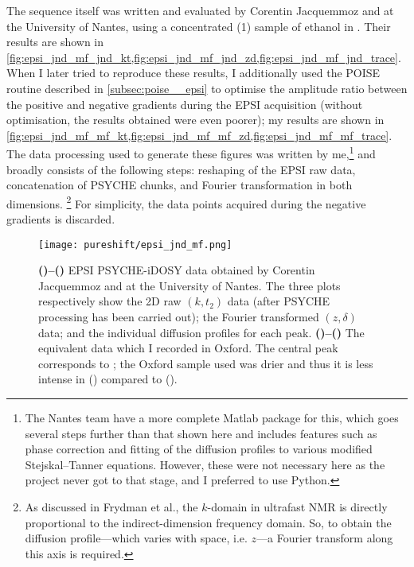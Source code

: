 The sequence itself was written and evaluated by Corentin Jacquemmoz and \JND{} at the University of Nantes, using a concentrated (\qty{1}{\molar}) sample of ethanol in .
Their results are shown in \cref{fig:epsi_jnd_mf_jnd_kt,fig:epsi_jnd_mf_jnd_zd,fig:epsi_jnd_mf_jnd_trace}.
When I later tried to reproduce these results, I additionally used the POISE routine described in \cref{subsec:poise__epsi} to optimise the amplitude ratio between the positive and negative gradients during the EPSI acquisition (without optimisation, the results obtained were even poorer); my results are shown in \cref{fig:epsi_jnd_mf_mf_kt,fig:epsi_jnd_mf_mf_zd,fig:epsi_jnd_mf_mf_trace}.
The data processing used to generate these figures was written by me,\footnote{The Nantes team have a more complete Matlab package for this, which goes several steps further than that shown here and includes features such as phase correction and fitting of the diffusion profiles to various modified Stejskal--Tanner equations. However, these were not necessary here as the project never got to that stage, and I preferred to use Python.} and broadly consists of the following steps: reshaping of the EPSI raw data, concatenation of PSYCHE chunks, and Fourier transformation in both dimensions.%
\footnote{As discussed in Frydman et al.\autocite{Frydman2003JACS}, the $k$-domain in ultrafast NMR is directly proportional to the indirect-dimension frequency domain. So, to obtain the diffusion profile---which varies with space, i.e. $z$---a Fourier transform along this axis is required.}
For simplicity, the data points acquired during the negative gradients is discarded.

\begin{figure}[htbp]
    \centering
    \texttt{[image: pureshift/epsi\_jnd\_mf.png]}%
    {\label{fig:epsi_jnd_mf_jnd_kt}}%
    {\label{fig:epsi_jnd_mf_jnd_zd}}%
    {\label{fig:epsi_jnd_mf_jnd_trace}}%
    {\label{fig:epsi_jnd_mf_mf_kt}}%
    {\label{fig:epsi_jnd_mf_mf_zd}}%
    {\label{fig:epsi_jnd_mf_mf_trace}}%
    \caption[Comparison of EPSI PSYCHE-iDOSY data acquired in Nantes and Oxford]{
        \textbf{()--()} EPSI PSYCHE-iDOSY data obtained by Corentin Jacquemmoz and \JND{} at the University of Nantes.
        The three plots respectively show the 2D raw $(k, t_2)$ data (after PSYCHE processing has been carried out); the Fourier transformed $(z, \delta)$ data; and the individual diffusion profiles for each peak.
        \textbf{()--()} The equivalent data which I recorded in Oxford.
        The central peak corresponds to ; the Oxford sample used was drier and thus it is less intense in () compared to ().
    }
    \label{fig:epsi_jnd_mf}
\end{figure}

